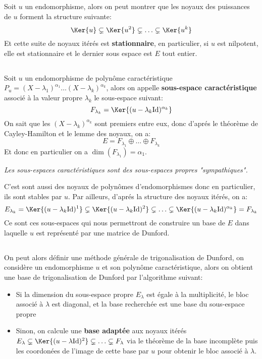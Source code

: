 \subsection*{}
Soit \(u\) un endomorphisme, alors on peut montrer que les noyaux des puissances de \(u\) forment la structure suivante:
\[
   \Ker{u} \subsetneq \Ker{u^2} \subsetneq \ldots \subsetneq \Ker{u^k}   
\]
Et cette suite de noyaux itérés est \textbf{stationnaire}, en particulier, si \(u\) est nilpotent, elle est stationnaire et le dernier sous espace est \(E\) tout entier.
\subsection*{}
Soit \(u\) un endomorphisme de polynôme caractéristique \(P_u = (X - \lambda_1)^{\alpha_1}\ldots(X - \lambda_k)^{\alpha_k}\), alors on appelle \textbf{sous-espace caractéristique} associé à la valeur propre \(\lambda_k\) le sous-espace suivant:
\[
   F_{\lambda_k} = \Ker{(u - \lambda_k\text{Id})^{\alpha_k}}   
\]
On sait que les \((X - \lambda_k)^{\alpha_k}\) sont premiers entre eux, donc d'aprés le théorème de Cayley-Hamilton et le lemme des noyaux, on a:
\[
   E = F_{\lambda_1} \oplus \ldots \oplus F_{\lambda_k}
\]
Et donc en particulier on a \(\dim(F_{\lambda_1}) = \alpha_1\).
\begin{center}
   \textit{Les sous-espaces caractéristiques sont des sous-espaces propres "sympathiques".}
\end{center}
C'est sont aussi des noyaux de polynômes d'endomorphismes donc en particulier, ils sont stables par \(u\). Par ailleurs, d'aprés la structure des noyaux itérés, on a:
\[
   E_{\lambda_k} = \Ker{(u - \lambda_k\text{Id})^1} \subsetneq \Ker{(u - \lambda_k\text{Id})^2} \subsetneq \ldots \subsetneq \Ker{(u - \lambda_k\text{Id})^{\alpha_k}} = F_{\lambda_k}
\]
Ce sont ces sous-espaces qui nous permettront de construire un base de \(E\) dans laquelle \(u\) est représenté par une matrice de Dunford.
\subsection*{}
On peut alors définir une méthode générale de trigonalisation de Dunford, on considère un endomorphisme \(u\) et son polynôme caractéristique, alors on obtient une base de trigonalisation de Dunford par l'algorithme suivant:
\begin{itemize}
   \item Si la dimension du sous-espace propre \(E_\lambda\) est égale à la multiplicité, le bloc associé à \(\lambda\) est diagonal, et la base recherchée est une base du sous-espace propre
   \item Sinon, on calcule une \textbf{base adaptée} aux noyaux itérés \(E_\lambda \subsetneq \Ker{(u - \lambda\text{Id})^2} \subsetneq \ldots \subsetneq F_\lambda\) via le théorème de la base incomplète puis les coordonées de l'image de cette base par \(u\) pour obtenir le bloc associé à \(\lambda\).
\end{itemize}

